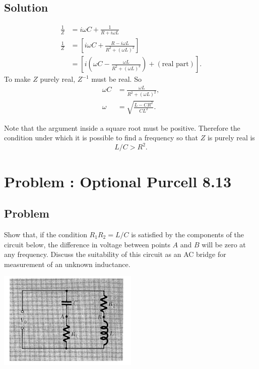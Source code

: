 \documentclass[solutions]{esg8022pset}
\begin{document}
\subsection{Solution}
  \begin{align}
  \frac{1}{Z} & = i\omega C + \frac{1}{R+i\omega L}\nonumber\\
  \frac{1}{Z} & =\left[i\omega C+\frac{R-i\omega L}{R^2+(\omega
  L)^2}\right]\nonumber\\
  & = \left[ i(\omega C-\frac{\omega L}{R^2+(\omega
  L)^2})+(\text{real part})\right].
  \end{align}
  To make $Z$ purely real, $Z^{-1}$ must be real.  So
  \begin{align}
  \omega C & = \frac{\omega L}{R^2+(\omega L)^2},\\
  \omega & = \sqrt{\frac{L-CR^2}{CL^2}}.
  \end{align}

  Note that the argument inside a square root must be positive.
  Therefore the condition under which it is possible to find
  a frequency so that $Z$ is purely real is
  \begin{equation}
  L/C>R^2.
  \end{equation}
\section{Problem \thesection: Optional Purcell 8.13}
\subsection{Problem}
  Show that, if the condition $R_1R_2 = L / C$ is satisfied by the
  components of the circuit below, the difference in voltage between points
  $A$ and $B$ will be zero at any frequency.  Discuss the suitability of
  this circuit as an AC bridge for measurement of an unknown inductance.

  \begin{center}
    \includegraphics[width = 0.5\textwidth]{figpu813}
  \end{center}
\end{document}
